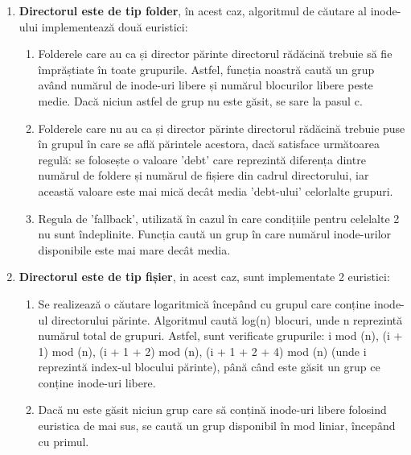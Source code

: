 \begin{enumerate}
  \item \textbf{Directorul este de tip folder}, în acest caz, algoritmul de căutare al inode-ului implementează două euristici:
  
  \begin{enumerate}
      \item Folderele care au ca și director părinte directorul rădăcină trebuie să fie împrăștiate în toate grupurile. Astfel, funcția noastră caută un grup având numărul de inode-uri libere și numărul blocurilor libere peste medie. Dacă niciun astfel de grup nu este găsit, se sare la pasul c.

      \item Folderele care nu au ca și director părinte directorul rădăcină trebuie puse în grupul în care se află părintele acestora, dacă satisface următoarea regulă: se folosește o valoare 'debt' care reprezintă diferența dintre numărul de foldere și numărul de fișiere din cadrul directorului, iar această valoare este mai mică decât media 'debt-ului' celorlalte grupuri.

      \item Regula de 'fallback', utilizată în cazul în care condițiile pentru celelalte 2 nu sunt îndeplinite. Funcția caută un grup în care numărul inode-urilor disponibile este mai mare decât media.
  \end{enumerate}

  \item \textbf{Directorul este de tip fișier}, in acest caz, sunt implementate 2 euristici:

  \begin{enumerate}
      \item Se realizează o căutare logaritmică începând cu grupul care conține inode-ul directorului părinte. Algoritmul caută log(n) blocuri, unde n reprezintă numărul total de grupuri. Astfel, sunt verificate grupurile: i mod (n), (i + 1) mod (n), (i + 1 + 2) mod (n), (i + 1 + 2 + 4) mod (n) (unde i reprezintă index-ul blocului părinte), până când este găsit un grup ce conține inode-uri libere.
      
      \item Dacă nu este găsit niciun grup care să conțină inode-uri libere folosind euristica de mai sus, se caută un grup disponibil în mod liniar, începând cu primul.
  \end{enumerate}

\end{enumerate}

